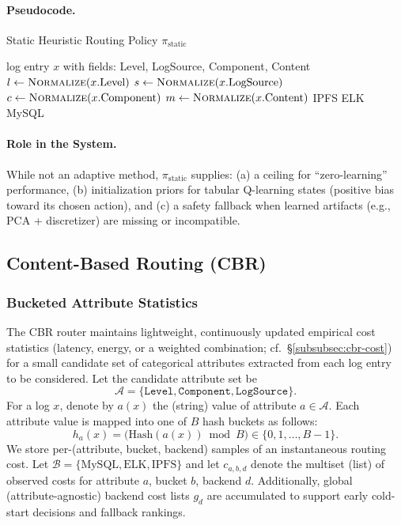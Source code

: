 \paragraph{Pseudocode.}
\begin{algorithm}[H]
\caption{Static Heuristic Routing Policy $\pi_{\text{static}}$}
\label{alg:static-heuristic}
\begin{algorithmic}[1]
\Require log entry $x$ with fields: Level, LogSource, Component, Content
  \State $l \gets \textsc{Normalize}(x.\text{Level})$
  \State $s \gets \textsc{Normalize}(x.\text{LogSource})$
  \State $c \gets \textsc{Normalize}(x.\text{Component})$
  \State $m \gets \textsc{Normalize}(x.\text{Content})$
     \State \Return IPFS
     \State \Return ELK
  \Else
     \State \Return MySQL
  \EndIf
\EndFunction
\end{algorithmic}
\end{algorithm}

\paragraph{Role in the System.}
While not an adaptive method, $\pi_{\text{static}}$ supplies: (a) a ceiling for ``zero-learning'' performance, (b) initialization priors for tabular Q-learning states (positive bias toward its chosen action), and (c) a safety fallback when learned artifacts (e.g., PCA + discretizer) are missing or incompatible.

\subsection{Content-Based Routing (CBR)}
\label{subsec:cbr}

\subsubsection{Bucketed Attribute Statistics}
\label{subsubsec:cbr-buckets}

The CBR router maintains lightweight, continuously updated empirical cost statistics (latency, energy, or a weighted combination; cf.~\S\ref{subsubsec:cbr-cost}) for a small candidate set of categorical attributes extracted from each log entry to be considered. Let the candidate attribute set be
\[
\mathcal{A} = \{\texttt{Level}, \texttt{Component}, \texttt{LogSource}\}.
\]
For a log $x$, denote by $a(x)$ the (string) value of attribute $a\in\mathcal{A}$. Each attribute value is mapped into one of $B$ hash buckets as follows:
\[
h_a(x) = \big(\mathrm{Hash}(a(x)) \bmod B\big) \in \{0,1,\dots,B-1\}.
\]
We store per-(attribute, bucket, backend) samples of an instantaneous routing cost. Let $\mathcal{B}=\{\text{MySQL}, \text{ELK}, \text{IPFS}\}$ and let $c_{a,b,d}$ denote the multiset (list) of observed costs for attribute $a$, bucket $b$, backend $d$. Additionally, global (attribute-agnostic) backend cost lists $g_d$ are accumulated to support early cold-start decisions and fallback rankings.

